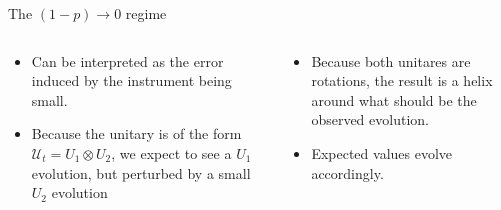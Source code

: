 \documentclass{cubeamer}
\newcommand{\mcU}{\mathcal{U}}
\begin{document}
\begin{frame}{The $(1-p)\rightarrow 0$ regime}
    \begin{columns}
        \begin{column}{0.5\textwidth}
            \begin{itemize}
                \item  Can be interpreted as the error induced by the instrument being small.
                \item  Because the unitary is of the form $\mcU_{t}=U_{1}\otimes U_{2}$, we expect to see a $U_{1}$ evolution, but perturbed by a small $U_{2}$ evolution
            \end{itemize}
        \end{column}
        \begin{column}{0.5\textwidth}
            \begin{itemize}
                \item Because both unitares are rotations, the result is a helix around what should be the observed evolution.
                \item Expected values evolve accordingly.
            \end{itemize}
        \end{column}
    \end{columns}
\end{frame}
\end{document}

